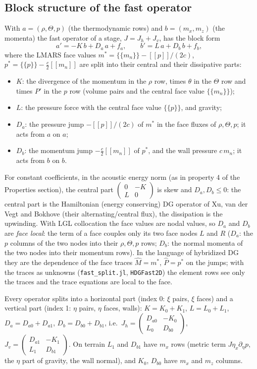 \documentclass[11pt,a4paper]{article}
\newcommand{\avg}[1]{\{\!\{#1\}\!\}}
\newcommand{\jump}[1]{[\![#1]\!]}
\newcommand{\code}[1]{\texttt{#1}}
\begin{document}
\subsection{Block structure of the fast operator}\label{sec:block}
With $a=(\rho,\Theta,p)$ (the thermodynamic rows) and $b=(m_x,m_z)$ (the momenta) the fast operator of a stage,
$J=J_h+J_v$, has the block form
\begin{equation}
a'=-K\,b+D_a\,a+f_a,\qquad b'=L\,a+D_b\,b+f_b,\label{eq:blocks}
\end{equation}
where the LMARS face values $m^*=\avg{m_n}-\jump p/(2c)$, $p^*=\avg p-\tfrac c2\jump{m_n}$ are split into their
central and their dissipative parts:
\begin{itemize}
\item $K$: the divergence of the momentum in the $\rho$ row, times $\theta$ in the $\Theta$ row and times $P'$ in the $p$ row
  (volume pairs and the central face value $\avg{m_n}$);
\item $L$: the pressure force with the central face value $\avg p$, and gravity;
\item $D_a$: the pressure jump $-\jump p/(2c)$ of $m^*$ in the face fluxes of $\rho,\Theta,p$; it acts from $a$ on $a$;
\item $D_b$: the momentum jump $-\tfrac c2\jump{m_n}$ of $p^*$, and the wall pressure $c\,m_n$; it acts from $b$ on $b$.
\end{itemize}
For constant coefficients, in the acoustic energy norm (as in property 4 of the Properties section), the central part
$\begin{pmatrix}0&-K\\L&0\end{pmatrix}$ is skew and $D_a,D_b\le0$: the central part is the Hamiltonian (energy conserving)
DG operator of Xu, van der Vegt and Bokhove \cite{xvb} (their alternating/central flux), the dissipation is the
upwinding. With LGL collocation the face values are nodal values, so $D_a$ and $D_b$ are \emph{face local}: the term of a
face couples only its two face nodes $L$ and $R$ ($D_a$: the $p$ columns of the two nodes into their $\rho,\Theta,p$ rows;
$D_b$: the normal momenta of the two nodes into their momentum rows). In the language of hybridized DG they are the
dependence of the face traces $\hat M=m^*$, $\hat P=p^*$ on the jumps; with the traces as unknowns (\code{fast\_split.jl},
\code{HDGFast2D}) the element rows see only the traces and the trace equations are local to the face.

Every operator splits into a horizontal part (index 0: $\xi$ pairs, $\xi$ faces) and a vertical part (index 1: $\eta$ pairs,
$\eta$ faces, walls): $K=K_0+K_1$, $L=L_0+L_1$, $D_a=D_{a0}+D_{a1}$, $D_b=D_{b0}+D_{b1}$, i.e.\ $J_h=\begin{pmatrix}D_{a0}&-K_0\\L_0&D_{b0}\end{pmatrix}$,
$J_v=\begin{pmatrix}D_{a1}&-K_1\\L_1&D_{b1}\end{pmatrix}$. On terrain $L_1$ and $D_{b1}$ have $m_x$ rows (metric term
$J\eta_x\partial_\eta p$, the $\eta$ part of gravity, the wall normal), and $K_0$, $D_{b0}$ have $m_x$ and $m_z$ columns.
\end{document}

